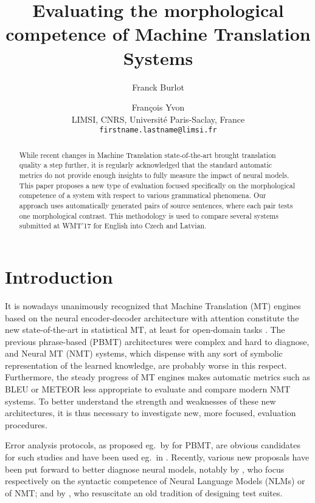 \documentclass[11pt,letterpaper,final,nohyperref]{article}
\title{Evaluating the morphological competence of Machine Translation Systems}
\author{Franck Burlot \and Fran\c{c}ois Yvon \\
         LIMSI, CNRS, Université Paris-Saclay, France \\
 {\tt firstname.lastname@limsi.fr}}
\date{}
\begin{document}
\maketitle
\begin{abstract}
While recent changes in Machine Translation state-of-the-art
brought translation quality a step further, it is regularly acknowledged 
that the standard automatic metrics do not provide enough insights
to fully measure the impact of neural models.
This paper 
proposes a new type of evaluation focused specifically
on the morphological competence of a system with respect
to various grammatical phenomena. Our approach uses automatically generated pairs of source sentences, where each pair tests one morphological contrast. 
This methodology is used to compare several systems submitted
at WMT'17 for English into Czech and Latvian.
\end{abstract}

\section{Introduction \label{sec:introduction}}
It is nowadays unanimously recognized that Machine Translation (MT) engines based on the neural encoder-decoder architecture with attention \cite{Cho14properties,Bahdanau15NMT} constitute the new state-of-the-art in statistical MT, at least for open-domain tasks \cite{Sennrich16WMT}. The previous phrase-based (PBMT) architectures were complex \cite{Koehn10smt} and hard to diagnose, and Neural MT (NMT) systems, which dispense with any sort of symbolic representation of the learned knowledge, are probably worse in this respect. Furthermore, the steady progress of MT engines makes 
automatic metrics such as BLEU \citep{Papineni02bleu} or METEOR \cite{Banerjee05meteor} less 
appropriate to evaluate and compare modern NMT systems. To better understand the strength and 
weaknesses of these new architectures, it is thus necessary to investigate new, more focused, evaluation procedures.

Error analysis protocols, as proposed eg.\ by \citet{Vilar06error,Popovic11towards} for PBMT, are obvious candidates for such studies and have been used eg.\ in \citep{Bentivogli16neural}. Recently, various new proposals have been put forward to better diagnose neural models, notably by \citet{Linzen16assessing,Sennrich17howgrammatical}, who focus respectively on the syntactic competence of Neural Language Models (NLMs) or of NMT; and by \citet{Isabelle17challenge, Burchardt17linguistic}, who resuscitate an old tradition of designing test suites.  
\end{document}
